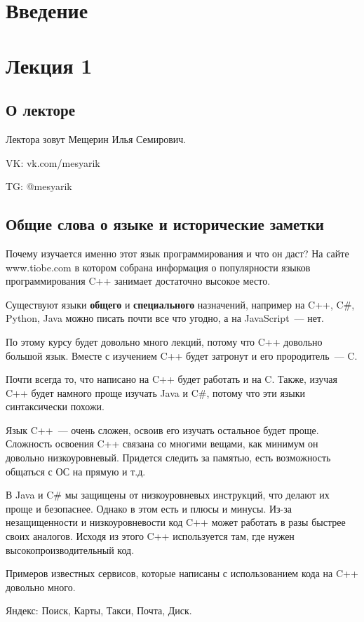 \section{Введение}
\section*{Лекция 1}

\subsection*{О лекторе}
Лектора зовут Мещерин Илья Семирович.

VK: vk.com/mesyarik

TG: @mesyarik

\subsection{Общие слова о языке и исторические заметки}
Почему изучается именно этот язык программирования и что он даст?
На сайте www.tiobe.com в котором собрана информация о популярности языков программирования C++ занимает достаточно высокое место.

Существуют языки \textbf{общего} и \textbf{специального} назначений,
например на C++, C\#, Python, Java можно писать почти все что угодно, а на JavaScript~--- нет.

По этому курсу будет довольно много лекций, потому что C++ довольно большой язык.
Вместе с изучением C++ будет затронут и его прородитель~--- C.

Почти всегда то, что написано на C++ будет работать и на C.
Также, изучая C++ будет намного проще изучать Java и C\#, потому что эти языки синтаксически похожи.

Язык C++~--- очень сложен, освоив его изучать остальное будет проще.
Сложность освоения C++ связана со многими вещами, как минимум он довольно низкоуровневый.
Придется следить за памятью, есть возможность общаться с ОС на прямую и т.д.

В Java и C\# мы защищены от низкоуровневых инструкций, что делают их проще и безопаснее.
Однако в этом есть и плюсы и минусы. Из-за незащищенности и низкоуровневости код C++ может работать в разы быстрее своих аналогов.
Исходя из этого C++ используется там, где нужен высокопроизводительный код.

Примеров известных сервисов, которые написаны с использованием кода на C++ довольно много.

Яндекс: Поиск, Карты, Такси, Почта, Диск.

